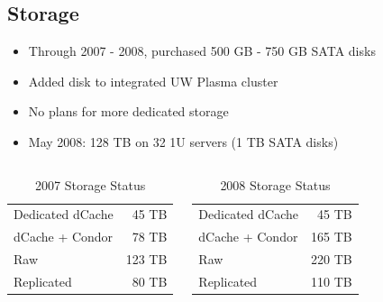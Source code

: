 \documentclass{beamer}
\begin{document}
\subsection{Storage}
\begin{frame}
\begin{itemize}
    \item Through 2007 - 2008, purchased 500 GB - 750 GB SATA disks
    \item Added disk to integrated UW Plasma cluster
    \item No plans for more dedicated storage
    \item May 2008: 128 TB on 32 1U servers (1 TB SATA disks)
\end{itemize}

\begin{columns}
\column{2.5in}
\begin{table}
    \begin{tabular}{lr}
        \toprule
        Dedicated dCache & 45 TB \\
        dCache + Condor & 78 TB \\
        \midrule
        Raw & 123 TB \\
        Replicated & 80 TB \\
        \bottomrule
    \end{tabular}
    \caption{2007 Storage Status}
    \label{2007_storage_status}
\end{table}

\column{2.5in}
\begin{table}
    \begin{tabular}{lr}
        \toprule
        Dedicated dCache & 45 TB \\
        dCache + Condor & 165 TB \\
        \midrule
        Raw & 220 TB \\
        Replicated & 110 TB \\
        \bottomrule
    \end{tabular}
    \caption{2008 Storage Status}
    \label{2008_storage_status}
\end{table}

\end{columns}
\end{frame}
\end{document}

